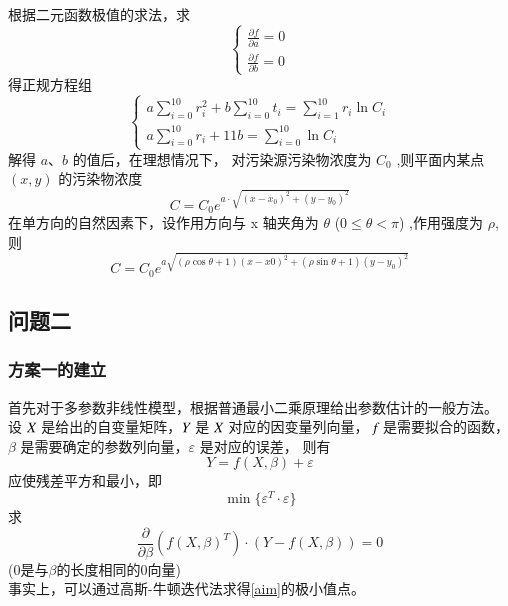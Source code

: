 \documentclass[UTF8]{ctexart}
\begin{document}
   根据二元函数极值的求法，求
   \begin{equation*}
  \left\{
    \begin{array}{rc}\frac{\partial f}{\partial a}=0\\
   \frac{\partial f}{\partial b}=0 \end{array}\right.
    \end{equation*}
  得正规方程组
   \begin{equation}\label{p1.1}
    \left\{
      \begin{array}{rcl}
        a \sum\limits_{i =0}^{10}{r_i^2}+b \sum\limits_{i =0}^{10}{t_i}=
        \sum\limits_{i=1}^{10}{r_i\ln{C_i}}\\
        a \sum\limits_{i =0}^{10}{r_i}+11b=\sum\limits_{i=0}^{10}{\ln{C_i}}
      \end{array}
    \right.
   \end{equation}
   解得 $a$、$b$ 的值后，在理想情况下，
   对污染源污染物浓度为 $C_0$ ,则平面内某点 $(x,y)$ 的污染物浓度
   \begin{equation}\label{p1.2}
    C=C_0e^{a\cdot \sqrt{(x-x_0)^2+(y-y_0)^2}} 
   \end{equation}
   在单方向的自然因素下，设作用方向与 x 轴夹角为 $\theta$ ($0\leq \theta<\pi$)
   ,作用强度为 $\rho $, 则
   \begin{equation}\label{p1.3}
    C=C_0 e^{a \sqrt{(\rho\cos{\theta}+1)(x-x0)^2+(\rho\sin{\theta}+1)(y-y_0)^2}}
   \end{equation}
  \subsection{问题二}
  

    \subsubsection{方案一的建立}
    首先对于多参数非线性模型，根据普通最小二乘原理给出参数估计的一般方法。
    \\
    设 $\emph{X}$ 是给出的自变量矩阵，$\emph{Y}$ 是 $\emph{X}$ 对应的因变量列向量，
    $\emph{f}$ 是需要拟合的函数，$ \beta$ 是需要确定的参数列向量，${\varepsilon}$
    是对应的误差， 则有
    $$ Y=f(X,\beta)+\varepsilon $$
    应使残差平方和最小，即
    \begin{equation}\label{aim}
       \min{ \{\varepsilon ^{T} \cdot \varepsilon\}} 
    \end{equation}
       求
    \begin{equation}
      \frac{\partial}{\partial \beta } (f(X,\beta)^{T})
      \cdot (Y-f(X,\beta))={0}
    \end{equation}
    (0是与$\beta $的长度相同的0向量)\\
    事实上，可以通过高斯-牛顿迭代法求得\ref{aim}的极小值点。
    
\end{document}
